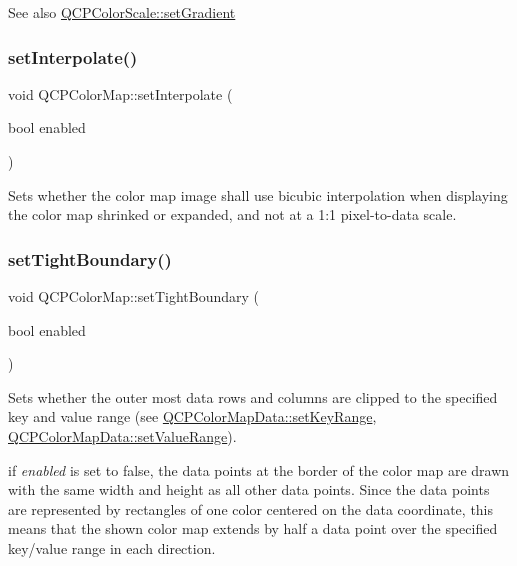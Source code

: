 \begin{DoxySeeAlso}{See also}
\hyperlink{class_q_c_p_color_scale_a1f29583bb6f1e7f473b62fb712be3940}{Q\+C\+P\+Color\+Scale\+::set\+Gradient} 
\end{DoxySeeAlso}
\hypertarget{class_q_c_p_color_map_a484eaa8a5065cfc386b15375bf98b964}{}\label{class_q_c_p_color_map_a484eaa8a5065cfc386b15375bf98b964} 
\subsubsection{\texorpdfstring{set\+Interpolate()}{setInterpolate()}}
{\footnotesize\ttfamily void Q\+C\+P\+Color\+Map\+::set\+Interpolate (\begin{DoxyParamCaption}\item[{bool}]{enabled }\end{DoxyParamCaption})}

Sets whether the color map image shall use bicubic interpolation when displaying the color map shrinked or expanded, and not at a 1\+:1 pixel-\/to-\/data scale.

\hypertarget{class_q_c_p_color_map_ad03221cc285e5f562a0b13d684b5576d}{}\label{class_q_c_p_color_map_ad03221cc285e5f562a0b13d684b5576d} 
\subsubsection{\texorpdfstring{set\+Tight\+Boundary()}{setTightBoundary()}}
{\footnotesize\ttfamily void Q\+C\+P\+Color\+Map\+::set\+Tight\+Boundary (\begin{DoxyParamCaption}\item[{bool}]{enabled }\end{DoxyParamCaption})}

Sets whether the outer most data rows and columns are clipped to the specified key and value range (see \hyperlink{class_q_c_p_color_map_data_a0738c485f3c9df9ea1241b7a8bb6a86e}{Q\+C\+P\+Color\+Map\+Data\+::set\+Key\+Range}, \hyperlink{class_q_c_p_color_map_data_ada1b2680ba96a5f4175b6d341cf75d23}{Q\+C\+P\+Color\+Map\+Data\+::set\+Value\+Range}).

if {\itshape enabled} is set to false, the data points at the border of the color map are drawn with the same width and height as all other data points. Since the data points are represented by rectangles of one color centered on the data coordinate, this means that the shown color map extends by half a data point over the specified key/value range in each direction.

